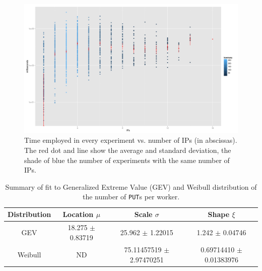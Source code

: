 \documentclass[journal,onecolumn]{IEEEtran}
\begin{document}
\begin{figure}[!htb]
\centering
\includegraphics[width=0.9\linewidth]{ips-time-ww.png}
\caption{Time employed in every experiment vs. number of IPs (in
  abscissas). The red dot and line show the average and standard
  deviation, the shade of blue the number of experiments with the same
  number of IPs. } 
\label{fig:ipstime:w2}
\end{figure}
%
%
\begin{table}
\caption{Summary of fit to Generalized Extreme Value (GEV) and Weibull distribution of
  the number of {\tt PUT}s per worker. \label{tab:puts:ww}}
\begin{center}
\begin{tabular}{cccc}
\hline
Distribution & Location $\mu$ & Scale $\sigma$ & Shape $\xi$ \\
\hline
GEV & 18.275 $\pm$ 0.83719  &  25.962  $\pm$ 1.22015 & 1.242   $\pm$
0.04746 \\
Weibull & ND & 75.11457519 $\pm$ 2.97470251  & 0.69714410 $\pm$ 0.01383976 \\
\hline
\end{tabular}
\end{center}
\end{table}
%
\end{document}
